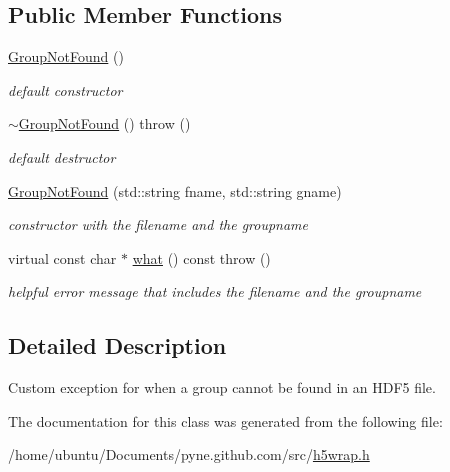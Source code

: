 \subsection*{Public Member Functions}
\begin{DoxyCompactItemize}
\item 
\hyperlink{classh5wrap_1_1_group_not_found_accc7d7bea9e86968335a46ee39d7d543}{Group\+Not\+Found} ()\hypertarget{classh5wrap_1_1_group_not_found_accc7d7bea9e86968335a46ee39d7d543}{}\label{classh5wrap_1_1_group_not_found_accc7d7bea9e86968335a46ee39d7d543}

\begin{DoxyCompactList}\small\item\em default constructor \end{DoxyCompactList}\item 
\hyperlink{classh5wrap_1_1_group_not_found_a79dea7d1d5e3ffd7a7e83b4a2636398a}{$\sim$\+Group\+Not\+Found} ()  throw ()\hypertarget{classh5wrap_1_1_group_not_found_a79dea7d1d5e3ffd7a7e83b4a2636398a}{}\label{classh5wrap_1_1_group_not_found_a79dea7d1d5e3ffd7a7e83b4a2636398a}

\begin{DoxyCompactList}\small\item\em default destructor \end{DoxyCompactList}\item 
\hyperlink{classh5wrap_1_1_group_not_found_a74f7e8f6efcf33503f5fec62eead40c3}{Group\+Not\+Found} (std\+::string fname, std\+::string gname)\hypertarget{classh5wrap_1_1_group_not_found_a74f7e8f6efcf33503f5fec62eead40c3}{}\label{classh5wrap_1_1_group_not_found_a74f7e8f6efcf33503f5fec62eead40c3}

\begin{DoxyCompactList}\small\item\em constructor with the filename and the groupname \end{DoxyCompactList}\item 
virtual const char $\ast$ \hyperlink{classh5wrap_1_1_group_not_found_a76766dc5fda0a07564379db454df87d0}{what} () const   throw ()\hypertarget{classh5wrap_1_1_group_not_found_a76766dc5fda0a07564379db454df87d0}{}\label{classh5wrap_1_1_group_not_found_a76766dc5fda0a07564379db454df87d0}

\begin{DoxyCompactList}\small\item\em helpful error message that includes the filename and the groupname \end{DoxyCompactList}\end{DoxyCompactItemize}


\subsection{Detailed Description}
Custom exception for when a group cannot be found in an H\+D\+F5 file. 

The documentation for this class was generated from the following file\+:\begin{DoxyCompactItemize}
\item 
/home/ubuntu/\+Documents/pyne.\+github.\+com/src/\hyperlink{h5wrap_8h}{h5wrap.\+h}\end{DoxyCompactItemize}
